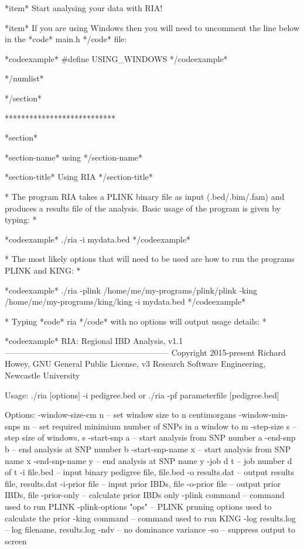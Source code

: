*item* Start analysing your data with RIA!

*item* If you are using Windows then you will need to uncomment the line below in the *code* main.h */code* file:

*codeexample*
#define USING_WINDOWS
*/codeexample*

*/numlist*

*/section*

***************************

*section*

*section-name*
using
*/section-name*

*section-title*
Using RIA
*/section-title*

*
The program RIA takes a PLINK binary file as input (.bed/.bim/.fam) and produces a results file of the analysis. Basic usage of the program is given by typing:
*

*codeexample*
./ria -i mydata.bed
*/codeexample*

*
The most likely options that will need to be used are how to run the programs PLINK and KING:
*

*codeexample*
./ria -plink /home/me/my-programs/plink/plink -king /home/me/my-programs/king/king -i mydata.bed
*/codeexample*

*
Typing *code* ria */code* with no options will output usage details:
*

*codeexample*
RIA: Regional IBD Analysis, v1.1
------------------------------------------------------------
Copyright 2015-present Richard Howey, GNU General Public License, v3
Research Software Engineering, Newcastle University

Usage:
  ./ria [options] -i pedigree.bed
 or ./ria -pf parameterfile [pedigree.bed]

Options:
  -window-size-cm n     -- set window size to n centimorgans
  -window-min-snps m    -- set required minimium number of SNPs in a window to m
  -step-size s          -- step size of windows, s
  -start-snp a          -- start analysis from SNP number a
  -end-snp b            -- end analysis at SNP number b
  -start-snp-name x     -- start analysis from SNP name x
  -end-snp-name y       -- end analysis at SNP name y
  -job d t              -- job number d of t
  -i file.bed           -- input binary pedigree file, file.bed
  -o results.dat        -- output results file, results.dat
  -i-prior file         -- input prior IBDs, file
  -o-prior file         -- output prior IBDs, file
  -prior-only           -- calculate prior IBDs only
  -plink command        -- command used to run PLINK
  -plink-options "ops"  -- PLINK pruning options used to calculate the prior
  -king command         -- command used to run KING
  -log results.log      -- log filename, results.log
  -ndv                  -- no dominance variance
  -so                   -- suppress output to screen

